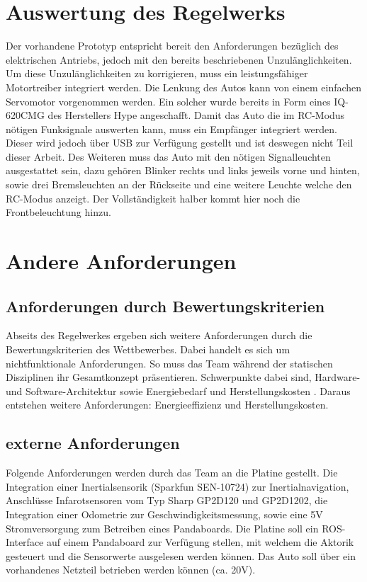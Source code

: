 \section{Auswertung des Regelwerks}
Der vorhandene Prototyp entspricht bereit den Anforderungen bezüglich des elektrischen Antriebs, jedoch mit den bereits beschriebenen Unzulänglichkeiten. 
Um diese Unzulänglichkeiten zu korrigieren, muss ein leistungsfähiger Motortreiber integriert werden.
Die Lenkung des Autos kann von einem einfachen Servomotor vorgenommen werden. Ein solcher wurde bereits in Form eines IQ-620CMG des Herstellers Hype angeschafft. 
Damit das Auto die im RC-Modus nötigen Funksignale auswerten kann, muss ein Empfänger integriert werden. Dieser wird jedoch über USB zur Verfügung gestellt
und ist deswegen nicht Teil dieser Arbeit. Des Weiteren muss das Auto mit den nötigen Signalleuchten ausgestattet sein, dazu gehören Blinker rechts und links
jeweils vorne und hinten, sowie drei Bremsleuchten an der Rückseite und eine weitere Leuchte welche den RC-Modus anzeigt. Der Vollständigkeit halber kommt hier noch die
Frontbeleuchtung hinzu.

\section{Andere Anforderungen}
\subsection{Anforderungen durch Bewertungskriterien}
Abseits des Regelwerkes ergeben sich weitere Anforderungen durch die Bewertungskriterien des Wettbewerbes. Dabei handelt es sich um nichtfunktionale Anforderungen.
So muss das Team während der statischen Disziplinen ihr Gesamtkonzept präsentieren. Schwerpunkte dabei sind, Hardware- und Software-Architektur sowie Energiebedarf und 
Herstellungskosten \cite{website-carolo-cup-regelwerk}. Daraus entstehen weitere Anforderungen: Energieeffizienz und Herstellungskosten. \\


\subsection{externe Anforderungen}
Folgende Anforderungen werden durch das Team an die Platine gestellt. Die Integration einer Inertialsensorik (Sparkfun SEN-10724) zur Inertialnavigation,
Anschlüsse Infarotsensoren vom Typ Sharp GP2D120 und GP2D1202, die Integration einer Odometrie zur Geschwindigkeitsmessung,
sowie eine 5V Stromversorgung zum Betreiben eines Pandaboards. Die Platine soll ein ROS-Interface auf einem Pandaboard zur Verfügung stellen, mit welchem die Aktorik gesteuert und
die Sensorwerte ausgelesen werden können. Das Auto soll über ein vorhandenes Netzteil betrieben werden können (ca. 20V).

